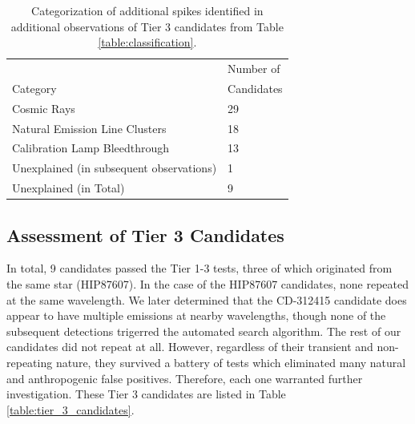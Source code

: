 \documentclass[twocolumn]{aastex701}
\begin{document}
\begin{table}
\begin{center}
\begin{tabular}{|l|l|} 
 \hline
 & Number of \\
 Category & Candidates \\ 
 \hline
 Cosmic Rays & 29 \\ 
 Natural Emission Line Clusters & 18 \\ 
 Calibration Lamp Bleedthrough &  13 \\ 
 Unexplained (in subsequent observations) & 1 \\
 Unexplained (in Total) & 9 \\
 \hline
 \end{tabular}
\end{center}

\caption{Categorization of additional spikes identified in additional observations of Tier 3 candidates from Table \ref{table:classification}.}
\label{table:followup}
\end{table}

\subsection{Assessment of Tier 3 Candidates}
\label{s:unexplained}
In total, 9 candidates passed the Tier 1-3 tests, three of which originated from the same star (HIP87607). In the case of the HIP87607 candidates, none repeated at the same wavelength. We later determined that the CD-312415 candidate does appear to have multiple emissions at nearby wavelengths, though none of the subsequent detections trigerred the automated search algorithm. The rest of our candidates did not repeat at all. However, regardless of their transient and non-repeating nature, they survived a battery of tests which eliminated many natural and anthropogenic false positives. Therefore, each one warranted further investigation. These Tier 3 candidates are listed in Table \ref{table:tier_3_candidates}.
\end{document}
